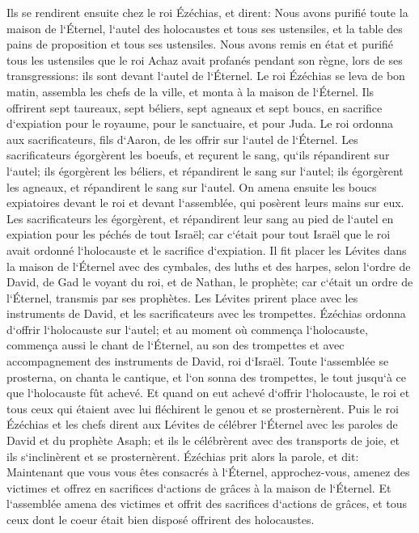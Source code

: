 \verse Ils se rendirent ensuite chez le roi Ézéchias, et dirent: Nous avons purifié toute la maison de l`Éternel, l`autel des holocaustes et tous ses ustensiles, et la table des pains de proposition et tous ses ustensiles. 
\verse Nous avons remis en état et purifié tous les ustensiles que le roi Achaz avait profanés pendant son règne, lors de ses transgressions: ils sont devant l`autel de l`Éternel. 
\verse Le roi Ézéchias se leva de bon matin, assembla les chefs de la ville, et monta à la maison de l`Éternel. 
\verse Ils offrirent sept taureaux, sept béliers, sept agneaux et sept boucs, en sacrifice d`expiation pour le royaume, pour le sanctuaire, et pour Juda. Le roi ordonna aux sacrificateurs, fils d`Aaron, de les offrir sur l`autel de l`Éternel. 
\verse Les sacrificateurs égorgèrent les boeufs, et reçurent le sang, qu`ils répandirent sur l`autel; ils égorgèrent les béliers, et répandirent le sang sur l`autel; ils égorgèrent les agneaux, et répandirent le sang sur l`autel. 
\verse On amena ensuite les boucs expiatoires devant le roi et devant l`assemblée, qui posèrent leurs mains sur eux. 
\verse Les sacrificateurs les égorgèrent, et répandirent leur sang au pied de l`autel en expiation pour les péchés de tout Israël; car c`était pour tout Israël que le roi avait ordonné l`holocauste et le sacrifice d`expiation. 
\verse Il fit placer les Lévites dans la maison de l`Éternel avec des cymbales, des luths et des harpes, selon l`ordre de David, de Gad le voyant du roi, et de Nathan, le prophète; car c`était un ordre de l`Éternel, transmis par ses prophètes. 
\verse Les Lévites prirent place avec les instruments de David, et les sacrificateurs avec les trompettes. 
\verse Ézéchias ordonna d`offrir l`holocauste sur l`autel; et au moment où commença l`holocauste, commença aussi le chant de l`Éternel, au son des trompettes et avec accompagnement des instruments de David, roi d`Israël. 
\verse Toute l`assemblée se prosterna, on chanta le cantique, et l`on sonna des trompettes, le tout jusqu`à ce que l`holocauste fût achevé. 
\verse Et quand on eut achevé d`offrir l`holocauste, le roi et tous ceux qui étaient avec lui fléchirent le genou et se prosternèrent. 
\verse Puis le roi Ézéchias et les chefs dirent aux Lévites de célébrer l`Éternel avec les paroles de David et du prophète Asaph; et ils le célébrèrent avec des transports de joie, et ils s`inclinèrent et se prosternèrent. 
\verse Ézéchias prit alors la parole, et dit: Maintenant que vous vous êtes consacrés à l`Éternel, approchez-vous, amenez des victimes et offrez en sacrifices d`actions de grâces à la maison de l`Éternel. Et l`assemblée amena des victimes et offrit des sacrifices d`actions de grâces, et tous ceux dont le coeur était bien disposé offrirent des holocaustes. 
